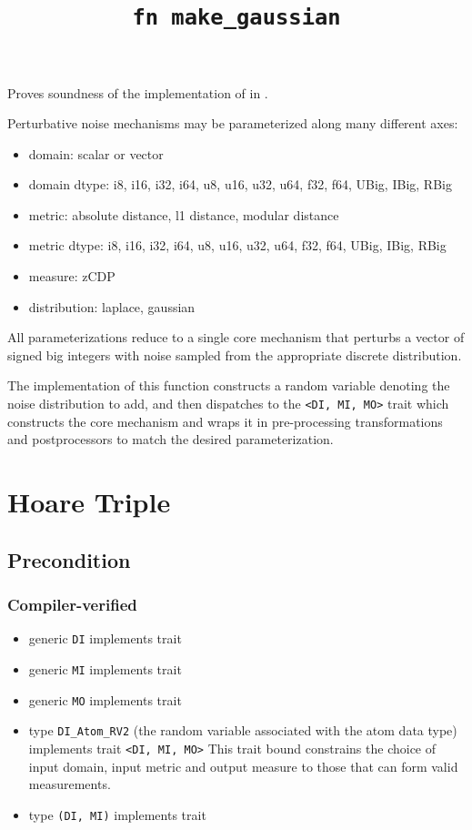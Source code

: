 \documentclass{article}
\title{\texttt{fn make\_gaussian}}
\author{\MichaelShoemateAuthor}
\date{}
\begin{document}
\maketitle

\contrib
Proves soundness of the implementation of  in .

Perturbative noise mechanisms may be parameterized along many different axes:
\begin{itemize}
    \item domain: scalar or vector
    \item domain dtype: i8, i16, i32, i64, u8, u16, u32, u64, f32, f64, UBig, IBig, RBig
    \item metric: absolute distance, l1 distance, modular distance
    \item metric dtype: i8, i16, i32, i64, u8, u16, u32, u64, f32, f64, UBig, IBig, RBig
    \item measure: zCDP
    \item distribution: laplace, gaussian
\end{itemize}

All parameterizations reduce to a single core mechanism that perturbs
a vector of signed big integers with noise sampled from the appropriate discrete distribution.

The implementation of this function constructs a random variable denoting the noise distribution to add,
and then dispatches to the \texttt{<DI, MI, MO>} trait
which constructs the core mechanism and wraps it in pre-processing transformations and postprocessors to match the desired parameterization.

\section{Hoare Triple}
\subsection*{Precondition}
\subsubsection*{Compiler-verified}
\begin{itemize}
    \item generic \texttt{DI} implements trait 
    \item generic \texttt{MI} implements trait 
    \item generic \texttt{MO} implements trait 
    \item type \texttt{DI\_Atom\_RV2} (the random variable associated with the atom data type) implements trait \texttt{<DI, MI, MO>}
        This trait bound constrains the choice of input domain, input metric and output measure to those that can form valid measurements.
    \item type \texttt{(DI, MI)} implements trait 
\end{itemize}
\end{document}
